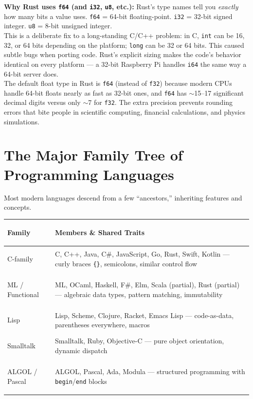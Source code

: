 \documentclass[11pt, letterpaper]{article}
\begin{document}
\begin{tcolorbox}[colback=part3bg, colframe=sectionpurple, arc=3pt, boxrule=1pt]
\textbf{Why Rust uses \texttt{f64} (and \texttt{i32}, \texttt{u8}, etc.):} Rust's type names tell you \emph{exactly} how many bits a value uses. \texttt{f64} = 64-bit floating-point. \texttt{i32} = 32-bit signed integer. \texttt{u8} = 8-bit unsigned integer.\\[4pt]
This is a deliberate fix to a long-standing C/C++ problem: in C, \texttt{int} can be 16, 32, or 64 bits depending on the platform; \texttt{long} can be 32 or 64 bits. This caused subtle bugs when porting code. Rust's explicit sizing makes the code's behavior identical on every platform --- a 32-bit Raspberry Pi handles \texttt{i64} the same way a 64-bit server does.\\[4pt]
The default float type in Rust is \texttt{f64} (instead of \texttt{f32}) because modern CPUs handle 64-bit floats nearly as fast as 32-bit ones, and \texttt{f64} has $\sim$15--17 significant decimal digits versus only $\sim$7 for \texttt{f32}. The extra precision prevents rounding errors that bite people in scientific computing, financial calculations, and physics simulations.
\end{tcolorbox}

\section*{The Major Family Tree of Programming Languages}

Most modern languages descend from a few ``ancestors,'' inheriting features and concepts.

\noindent
{\renewcommand{\arraystretch}{1.5}
\begin{tabularx}{\textwidth}{>{\bfseries\raggedright\arraybackslash}p{3cm}
                              >{\raggedright\arraybackslash}X}
\toprule
\rowcolor{tableheaderpurple}
\textbf{Family} & \textbf{Members \& Shared Traits} \\
\midrule
\rowcolor{rowPu} C-family       & C, C++, Java, C\#, JavaScript, Go, Rust, Swift, Kotlin --- curly braces \texttt{\{\}}, semicolons, similar control flow \\
\rowcolor{rowA}  ML / Functional & ML, OCaml, Haskell, F\#, Elm, Scala (partial), Rust (partial) --- algebraic data types, pattern matching, immutability \\
\rowcolor{rowPu} Lisp           & Lisp, Scheme, Clojure, Racket, Emacs Lisp --- code-as-data, parentheses everywhere, macros \\
\rowcolor{rowA}  Smalltalk      & Smalltalk, Ruby, Objective-C --- pure object orientation, dynamic dispatch \\
\rowcolor{rowPu} ALGOL / Pascal  & ALGOL, Pascal, Ada, Modula --- structured programming with \texttt{begin}/\texttt{end} blocks \\
\bottomrule
\end{tabularx}}
\end{document}
